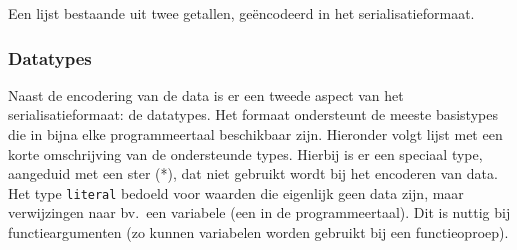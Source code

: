 \begin{listing}
    \inputminted{json}{code/format.json}
    \caption{Een lijst bestaande uit twee getallen, geëncodeerd in het serialisatieformaat.}
    \label{lst:serialisation}
\end{listing}

\subsubsection{Datatypes}

Naast de encodering van de data is er een tweede aspect van het serialisatieformaat: de datatypes.
Het formaat ondersteunt de meeste basistypes die in bijna elke programmeertaal beschikbaar zijn.
Hieronder volgt lijst met een korte omschrijving van de ondersteunde types.
Hierbij is er een speciaal type, aangeduid met een ster (*), dat niet gebruikt wordt bij het encoderen van data.
Het type \texttt{literal} bedoeld voor waarden die eigenlijk geen data zijn, maar verwijzingen naar bv.\ een variabele (een  in de programmeertaal).
Dit is nuttig bij functieargumenten (zo kunnen variabelen worden gebruikt bij een functieoproep).

